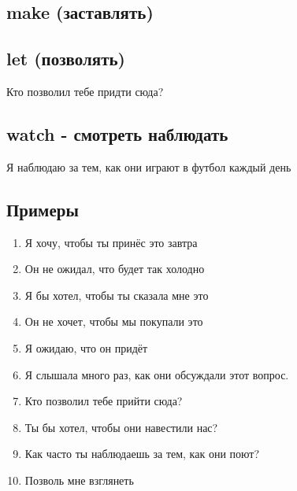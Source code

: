 \subsection{make (заставлять)}
\p
{}

\subsection{let (позволять)}
\p
Кто позволил тебе придти сюда?\\

\subsection{watch - смотреть наблюдать}
\p
Я наблюдаю за тем, как они играют в футбол каждый день\\

\subsection{Примеры}
\p
\begin{enumerate}
    \item Я хочу, чтобы ты принёс это завтра \\ 
    \item Он не ожидал, что будет так холодно \\ 
    \item Я бы хотел, чтобы ты сказала мне это \\ 
    \item Он не хочет, чтобы мы покупали это \\ 
    \item Я ожидаю, что он придёт \\ 
    \item Я слышала много раз, как они обсуждали этот вопрос. \\ 
    \item Кто позволил тебе прийти сюда? \\ 
    \item Ты бы хотел, чтобы они навестили нас? \\ 
    \item Как часто ты наблюдаешь за тем, как они поют? \\ 
    \item Позволь мне взглянеть \\ 
\end{enumerate}